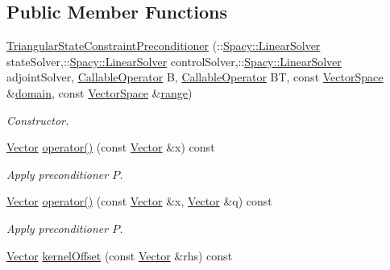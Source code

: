 \subsection*{Public Member Functions}
\begin{DoxyCompactItemize}
\item 
\hyperlink{classSpacy_1_1CG_1_1TriangularStateConstraintPreconditioner_a8bbfa8bf7bdfcd3c308d4dbec8c448d0}{Triangular\+State\+Constraint\+Preconditioner} (\+::\hyperlink{namespaceSpacy_adcd0d78166a9c972b8a2e5a689fc2d03}{Spacy\+::\+Linear\+Solver} state\+Solver,\+::\hyperlink{namespaceSpacy_adcd0d78166a9c972b8a2e5a689fc2d03}{Spacy\+::\+Linear\+Solver} control\+Solver,\+::\hyperlink{namespaceSpacy_adcd0d78166a9c972b8a2e5a689fc2d03}{Spacy\+::\+Linear\+Solver} adjoint\+Solver, \hyperlink{namespaceSpacy_a022a87afa759e18781dd2aea9a80cd73}{Callable\+Operator} B, \hyperlink{namespaceSpacy_a022a87afa759e18781dd2aea9a80cd73}{Callable\+Operator} BT, const \hyperlink{classSpacy_1_1VectorSpace}{Vector\+Space} \&\hyperlink{classSpacy_1_1OperatorBase_a2588f9b3e0188820c4c494e63293dc6f}{domain}, const \hyperlink{classSpacy_1_1VectorSpace}{Vector\+Space} \&\hyperlink{classSpacy_1_1OperatorBase_ab19d3b7a6f290b1079248f1e567e53d6}{range})
\begin{DoxyCompactList}\small\item\em Constructor. \end{DoxyCompactList}\item 
\hyperlink{classSpacy_1_1Vector}{Vector} \hyperlink{classSpacy_1_1CG_1_1TriangularStateConstraintPreconditioner_acf6c7985d679599274592917fdae5cbc}{operator()} (const \hyperlink{classSpacy_1_1Vector}{Vector} \&x) const 
\begin{DoxyCompactList}\small\item\em Apply preconditioner $P$. \end{DoxyCompactList}\item 
\hyperlink{classSpacy_1_1Vector}{Vector} \hyperlink{classSpacy_1_1CG_1_1TriangularStateConstraintPreconditioner_aa9baf40f360b9544b50904dc93371c3c}{operator()} (const \hyperlink{classSpacy_1_1Vector}{Vector} \&x, \hyperlink{classSpacy_1_1Vector}{Vector} \&q) const 
\begin{DoxyCompactList}\small\item\em Apply preconditioner $P$. \end{DoxyCompactList}\item 
\hyperlink{classSpacy_1_1Vector}{Vector} \hyperlink{classSpacy_1_1CG_1_1TriangularStateConstraintPreconditioner_a959f6f366b868163b6cbeda7c96bcc8e}{kernel\+Offset} (const \hyperlink{classSpacy_1_1Vector}{Vector} \&rhs) const 

\end{DoxyCompactItemize}
